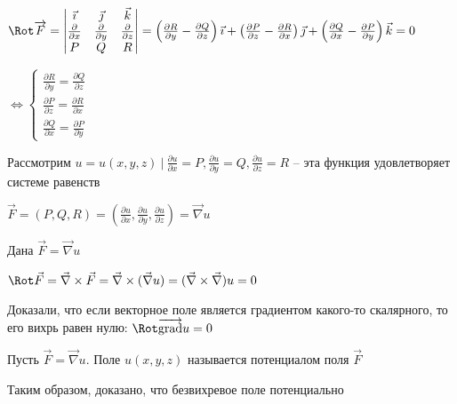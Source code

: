 \documentclass[12pt]{article}
\begin{document}
    \begin{MyProof}
        \fbox{$\Longrightarrow$}

        $\Rot \overrightarrow{F} =
        \begin{vmatrix}
            \vec\imath & \vec\jmath & \vec k \\
            \frac{\partial}{\partial x} & \frac{\partial}{\partial y} & \frac{\partial}{\partial z} \\
            P & Q & R
        \end{vmatrix} = \left(\frac{\partial R}{\partial y} - \frac{\partial Q}{\partial z}\right)\vec\imath + \left(\frac{\partial P}{\partial z} - \frac{\partial R}{\partial x}\right)\vec\jmath + \left(\frac{\partial Q}{\partial x} - \frac{\partial P}{\partial y}\right)\vec{k} = 0$

        $\Longleftrightarrow
        \begin{cases}
            \frac{\partial R}{\partial y} = \frac{\partial Q}{\partial z} \\
            \frac{\partial P}{\partial z} = \frac{\partial R}{\partial x} \\
            \frac{\partial Q}{\partial x} = \frac{\partial P}{\partial y}
        \end{cases}$

        Рассмотрим $u = u(x, y, z) \ | \ \frac{\partial u}{\partial x} = P, \frac{\partial u}{\partial y} = Q, \frac{\partial u}{\partial z} = R$ -- эта функция удовлетворяет системе равенств

        $\vec{F} = (P, Q, R) = \left(\frac{\partial u}{\partial x}, \frac{\partial u}{\partial y}, \frac{\partial u}{\partial z}\right) = \vec\nabla u$

        \fbox{$\Longleftarrow$} Дана $\vec{F} = \vec\nabla u$

        $\Rot \vec{F} = \vec\nabla \times \vec{F} = \vec\nabla \times (\vec\nabla u) = (\vec\nabla \times \vec\nabla) u = 0$

    \end{MyProof}

    \Nota Доказали, что если векторное поле является градиентом какого-то скалярного, то его вихрь равен нулю: $\Rot \overrightarrow{\operatorname{grad}} u = 0$

    \Def Пусть $\vec{F} = \vec\nabla u$. Поле $u(x, y, z)$ называется потенциалом поля $\vec{F}$

    Таким образом, доказано, что безвихревое поле потенциально

    \hypertarget{solenoidalfieldproperty}{}
\end{document}
